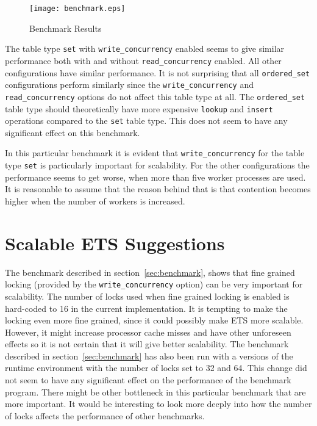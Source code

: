 \documentclass[aps,pre,preprint,nofootinbib]{revtex4}
\begin{document}
  
\begin{figure}[htb]
\centering
\texttt{[image: benchmark.eps]}
\caption{Benchmark Results} 
\label{fig:benchmark_results}
\end{figure}

  The table type \verb|set| with \verb|write_concurrency| enabled seems to give similar performance both with and without \verb|read_concurrency| enabled.
  All other configurations have similar performance.
  It is not surprising that all \verb|ordered_set| configurations perform similarly since the \verb|write_concurrency| and \verb|read_concurrency| options do not affect this table type at all.
  The \verb|ordered_set| table type should theoretically have more expensive \verb|lookup| and \verb|insert| operations compared to the \verb|set| table type.
  This does not seem to have any significant effect on this benchmark.
  
  In this particular benchmark it is evident that \verb|write_concurrency| for the table type \verb|set| is particularly important for scalability.
  For the other configurations the performance seems to get worse, when more than five worker processes are used.
  It is reasonable to assume that the reason behind that is that contention becomes higher when the number of workers is increased.

  
  
\section{Scalable ETS Suggestions}

  The benchmark described in section~\ref{sec:benchmark}, shows that fine grained locking (provided by the \verb|write_concurrency| option) can be very important for scalability.
  The number of locks used when fine grained locking is enabled is hard-coded to 16 in the current implementation.
  It is tempting to make the locking even more fine grained, since it could possibly make ETS more scalable.
  However, it might increase processor cache misses and have other unforeseen effects so it is not certain that it will give better scalability.   
  The benchmark described in section~\ref{sec:benchmark} has also been run with a versions of the runtime environment with the number of locks set to 32 and 64.
  This change did not seem to have any significant effect on the performance of the benchmark program.
  There might be other bottleneck in this particular benchmark that are more important.
  It would be interesting to look more deeply into how the number of locks affects the performance of other benchmarks.
  
\end{document}

